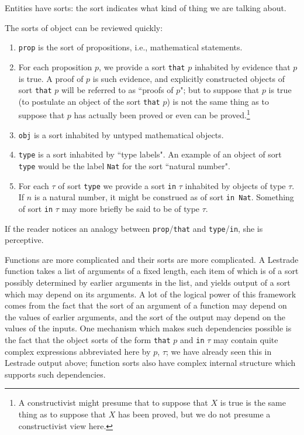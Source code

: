 \documentclass[12pt]{article}
\begin{document}
Entities have sorts:  the sort indicates what kind of thing we are talking about.  

The sorts of object can be reviewed quickly:

\begin{enumerate}

\item {\tt prop} is the sort of propositions, i.e., mathematical statements.

\item For each proposition $p$, we provide a sort {\tt that} $p$ inhabited by evidence that $p$ is true.  A proof of $p$ is such evidence, and explicitly constructed objects of sort {\tt that} $p$ will be referred to as ``proofs of $p$";  but to suppose that $p$ is true (to postulate an object of the sort {\tt that} $p$) is not the same thing as to suppose that $p$ has actually been proved or even can be proved.\footnote{A constructivist might presume that to suppose that $X$ is true is the same thing as to suppose that $X$ has been proved, but we do not presume a constructivist view here.}

\item {\tt obj} is a sort inhabited by untyped mathematical objects.

\item {\tt type} is a sort inhabited by ``type labels".  An example of an object of sort {\tt type} would be the label {\tt Nat} for the sort ``natural number".

\item For each $\tau$ of sort {\tt type} we provide a sort {\tt in} $\tau$ inhabited by objects of type $\tau$.  If $n$ is a natural number, it might be construed as of sort {\tt in Nat}.  Something of sort {\tt in} $\tau$ may more briefly be said to be of type $\tau$.

\end{enumerate}

If the reader notices an analogy between {\tt prop}/{\tt that} and {\tt type}/{\tt in}, she is perceptive.

Functions are more complicated and their sorts are more complicated.  A Lestrade function takes a list of arguments of a fixed length, each item of which is of a sort possibly determined by earlier arguments in the list, and yields output of a sort which may depend on its arguments.  A lot of the logical power of this framework comes from the fact that the sort of an argument of a function may depend on the values of earlier arguments, and the sort of the output may depend on the values of the inputs.  One mechanism which makes such dependencies possible is the fact that the object sorts of the form {\tt that} $p$ and {\tt in} $\tau$ may contain quite complex expressions abbreviated here by $p$, $\tau$;  we have already seen this in Lestrade output above;  function sorts also have complex internal structure which supports such dependencies.
\end{document}
